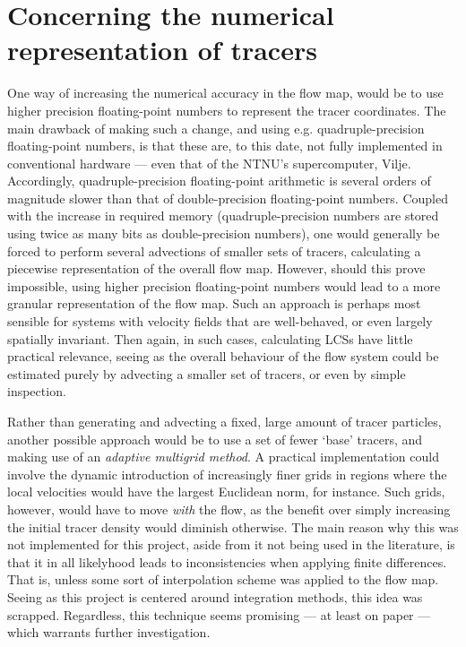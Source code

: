 \section{Concerning the numerical representation of tracers}
\label{sec:concerning_the_numerical_representation_of_tracers}

One way of increasing the numerical accuracy in the flow map, would be
to use higher precision floating-point numbers to represent the tracer
coordinates. The main drawback of making such a change, and using e.g.
quadruple-precision floating-point numbers, is that these are, to this date,
not fully implemented in conventional hardware --- even that of the NTNU's
supercomputer, Vilje. Accordingly, quadruple-precision floating-point
arithmetic is several orders of magnitude slower than that of double-precision
floating-point numbers. Coupled with the increase in required memory
(quadruple-precision numbers are stored using twice as many bits as
double-precision numbers), one would generally be forced to perform several
advections of smaller sets of tracers, calculating a piecewise representation
of the overall flow map. However, should this prove impossible, using higher
precision floating-point numbers would lead to a more granular representation
of the flow map. Such an approach is perhaps most sensible for systems with
velocity fields that are well-behaved, or even largely spatially invariant.
Then again, in such cases, calculating LCSs have little practical relevance,
seeing as the overall behaviour of the flow system could be estimated purely by
advecting a smaller set of tracers, or even by simple inspection.

Rather than generating and advecting a fixed, large amount of tracer particles,
another possible approach would be to use a set of fewer `base' tracers, and
making use of an \emph{adaptive multigrid method}. A practical implementation
could involve the dynamic introduction of increasingly finer grids in regions
where the local velocities would have the largest Euclidean norm, for instance.
Such grids, however, would have to move \emph{with} the flow, as the
benefit over simply increasing the initial tracer density would diminish
otherwise. The main reason why this was not implemented for this project,
aside from it not being used in the literature, is that it in all likelyhood
leads to inconsistencies when applying finite differences. That is, unless some
sort of interpolation scheme was applied to the flow map. Seeing as this
project is centered around integration methods, this idea was scrapped.
Regardless, this technique seems promising --- at least on paper --- which
warrants further investigation.
%
